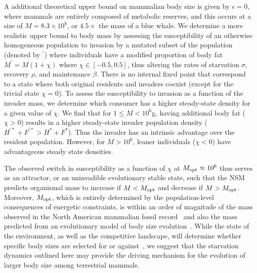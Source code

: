 \documentclass{pnastwo}
\newcommand{\sid}[1]{\textcolor{red}{\bf [#1]}}
\begin{document}
\begin{article}
A additional theoretical upper bound on mammalian body size is given by $\epsilon=0$, where mammals are entirely composed of metabolic reserves, and this occurs at a size of $M=8.3\times 10^8$, or $4.5\times$ the mass of a blue whale.
We determine a more realistic upper bound to body mass by assessing the
susceptibility of an otherwise homogeneous population to invasion by a
mutated subset of the population (denoted by ${}^\prime$) where individuals
have a modified proportion of body fat $M^\prime=M(1+\chi)$ where
$\chi \in [-0.5,0.5]$, thus altering the rates of starvation $\sigma$,
recovery $\rho$, and maintenance $\beta$.  There is no internal fixed point
that correspond to a state where both original residents and invaders coexist
(except for the trivial state $\chi=0$).  To assess the susceptibility to
invasion as a function of the invader mass, we determine which consumer has a
higher steady-state density for a given value of $\chi$.  We find that for
$1\leq M<10^6$g, having additional body fat ($\chi > 0$) results in a higher
steady-state invader population density
($H^{\prime *}+F^{\prime *}>H^*+F^*$).  Thus the invader has an intrinsic
advantage over the resident population.  However, for $M>10^6$, leaner
individuals ($\chi < 0$) have advantageous steady state densities.

The observed switch in susceptibility as a function of $\chi$ at
$M_{\rm opt}\approx10^6$ thus serves as an attractor, or an uninvadible evolutionary stable state, such that the NSM predicts organismal mass to increase if $M<M_{\rm opt}$ and
decrease if $M>M_{\rm opt}$.  Moreover, $M_{\rm opt}$, which is entirely
determined by the population-level consequences of energetic constraints, is
within an order of magnitude of the mass observed in the North American
mammalian fossil record~\cite{Alroy:1998p1594} and also the mass predicted
from an evolutionary model of body size evolution~\cite{Clauset:2009fh}.
While the state of the environment, as well as the competitive landscape,
will determine whether specific body sizes are selected for or
against~\cite{Saarinen:2014br}, we suggest that the starvation dynamics
outlined here may provide the driving mechanism for the evolution of larger
body size among terrestrial mammals.



\end{article}
\end{document}
